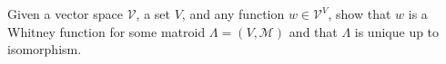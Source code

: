 Given a vector space $\mathcal{V}$, a set $V$, and any function $w \in \mathcal{V}^V$, show that $w$ is a Whitney function for some matroid $\Lambda = (V, \mathcal{M})$ and that $\Lambda$ is unique up to isomorphism.
